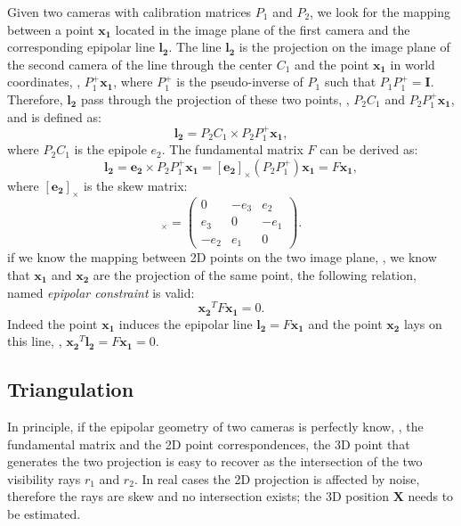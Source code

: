 Given two cameras with calibration matrices $P_1$ and $P_2$, we look for the mapping between a point $\mathbf{x_1}$ located in the image plane of the first camera and the corresponding epipolar line $\mathbf{l_2}$. 
The line $\mathbf{l_2}$ is the projection on the image plane of the second camera of the line through the center $C_1$ and the point $\mathbf{x_1}$ in world coordinates, \ie, $P_1^+\mathbf{x_1}$, where $P_1^+$ is the pseudo-inverse of $P_1$ such that $P_1P_1^+ = \mathbf{I}$.
Therefore, $\mathbf{l_2}$ pass through the projection of these two points, \ie, $P_2C_1$ and $P_2P_1^+\mathbf{x_1}$, and is defined as:
\begin{equation}
 \mathbf{l_2} =  P_2C_1 \times P_2P_1^+\mathbf{x_1},
\end{equation}
where $P_2C_1$ is the epipole $e_2$. The fundamental matrix $F$ can be derived as:
\begin{equation}
 \mathbf{l_2} =  \mathbf{e_2} \times P_2P_1^+\mathbf{x_1} = [\mathbf{e_2}]_{\times} (P_2P_1^+)\mathbf{x_1} = F \mathbf{x_1},
\end{equation}
where $[\mathbf{e_2}]_{\times}$ is the skew matrix:
\begin{equation}
  [e]_{\times} =
  \begin{pmatrix}
    0   & -e_3 & e_2\\
    e_3 &   0  & -e_1\\
   -e_2 &  e_1 & 0
  \end{pmatrix}.
\end{equation}
if we know the mapping between 2D points on the two image plane, \eg, we know that $\mathbf{x_1}$ and $\mathbf{x_2}$ are the projection of the same point, the following relation, named \emph{epipolar constraint} is valid:
\begin{equation}
  \mathbf{x_2}^{T} F \mathbf{x_1} = 0.
\end{equation}
Indeed the point  $\mathbf{x_1}$ induces the epipolar line $\mathbf{l_2} = F \mathbf{x_1}$ and the point $\mathbf{x_2}$ lays on this line, \ie, $\mathbf{x_2}^{T} \mathbf{l_2} =  F \mathbf{x_1} = 0$.

\subsection{Triangulation}
In principle, if the epipolar geometry of two cameras is perfectly know, \ie, the fundamental matrix and the 2D point correspondences, the 3D point that generates the two projection is easy to recover as the intersection of the two visibility rays $r_1$ and $r_2$. 
In real cases the 2D projection is affected by noise, therefore the rays are skew and no intersection exists; the 3D position $\mathbf{X}$ needs to be estimated.

